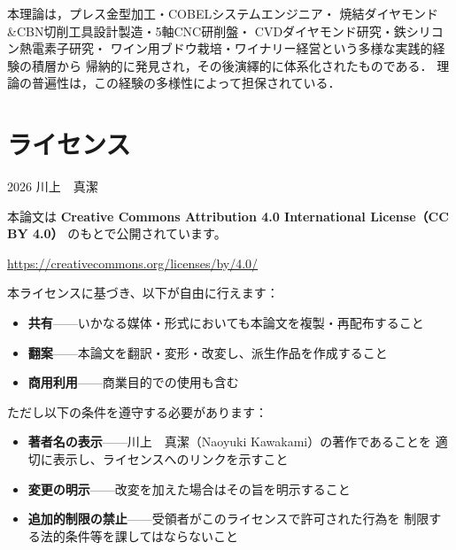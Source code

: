 \documentclass[12pt, a4paper]{article}
\theoremstyle{definition}
\begin{document}
\noindent
本理論は，プレス金型加工・COBELシステムエンジニア・
焼結ダイヤモンド\&CBN切削工具設計製造・5軸CNC研削盤・
CVDダイヤモンド研究・鉄シリコン熱電素子研究・
ワイン用ブドウ栽培・ワイナリー経営という多様な実践的経験の積層から
帰納的に発見され，その後演繹的に体系化されたものである．
理論の普遍性は，この経験の多様性によって担保されている．

\section*{ライセンス}

\noindent
\textcopyright{} 2026 川上　真潔

\vspace{0.5em}
\noindent
本論文は
\textbf{Creative Commons Attribution 4.0 International License（CC BY 4.0）}
のもとで公開されています。

\vspace{0.5em}
\noindent
\url{https://creativecommons.org/licenses/by/4.0/}

\vspace{0.8em}
\noindent
本ライセンスに基づき、以下が自由に行えます：

\begin{itemize}
  \item \textbf{共有}——いかなる媒体・形式においても本論文を複製・再配布すること
  \item \textbf{翻案}——本論文を翻訳・変形・改変し、派生作品を作成すること
  \item \textbf{商用利用}——商業目的での使用も含む
\end{itemize}

\vspace{0.5em}
\noindent
ただし以下の条件を遵守する必要があります：

\begin{itemize}
  \item \textbf{著者名の表示}——川上　真潔（Naoyuki Kawakami）の著作であることを
        適切に表示し、ライセンスへのリンクを示すこと
  \item \textbf{変更の明示}——改変を加えた場合はその旨を明示すること
  \item \textbf{追加的制限の禁止}——受領者がこのライセンスで許可された行為を
        制限する法的条件等を課してはならないこと
\end{itemize}
\end{document}
